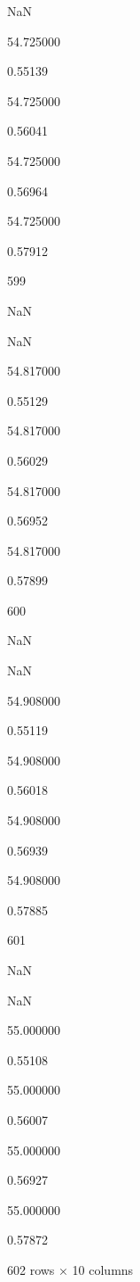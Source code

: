 NaN

54.725000

0.55139

54.725000

0.56041

54.725000

0.56964

54.725000

0.57912

599

NaN

NaN

54.817000

0.55129

54.817000

0.56029

54.817000

0.56952

54.817000

0.57899

600

NaN

NaN

54.908000

0.55119

54.908000

0.56018

54.908000

0.56939

54.908000

0.57885

601

NaN

NaN

55.000000

0.55108

55.000000

0.56007

55.000000

0.56927

55.000000

0.57872

602 rows × 10 columns

\begin{Shaded}
\begin{Highlighting}[]

\end{Highlighting}
\end{Shaded}

